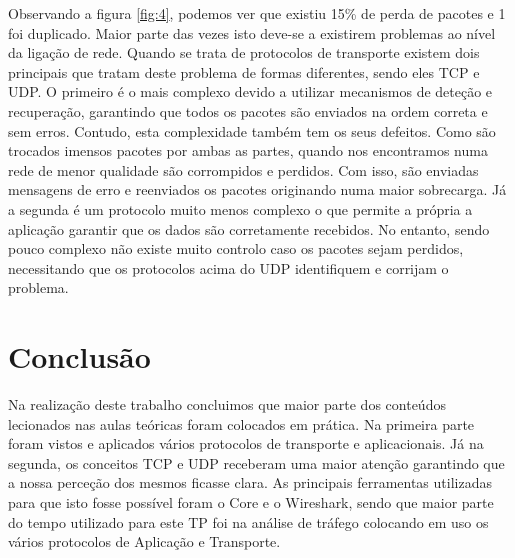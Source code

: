 \documentclass[a4paper]{report}
\begin{document}
Observando a figura \ref{fig:4}, podemos ver que existiu 15\% de perda de pacotes e 1 foi duplicado. Maior parte das vezes isto
deve-se a existirem problemas ao nível da ligação de rede. Quando se trata de protocolos de transporte existem dois principais
que tratam deste problema de formas diferentes, sendo eles TCP e UDP. O primeiro é o mais complexo devido a utilizar mecanismos
de deteção e recuperação, garantindo que todos os pacotes são enviados na ordem correta e sem erros. Contudo, esta complexidade
também tem os seus defeitos. Como são trocados imensos pacotes por ambas as partes, quando nos encontramos numa rede de menor 
qualidade são corrompidos e perdidos. Com isso, são enviadas mensagens de erro e reenviados os pacotes originando numa maior
sobrecarga. Já a segunda é um protocolo muito menos complexo o que permite a própria a aplicação garantir que os dados são 
corretamente recebidos. No entanto, sendo pouco complexo não existe muito controlo caso os pacotes sejam perdidos, necessitando
que os protocolos acima do UDP identifiquem e corrijam o problema.

\chapter{Conclusão}

Na realização deste trabalho concluimos que maior parte dos conteúdos lecionados nas aulas teóricas foram colocados em prática.
Na primeira parte foram vistos e aplicados vários protocolos de transporte e aplicacionais.
Já na segunda, os conceitos TCP e UDP receberam uma maior atenção garantindo que a nossa perceção dos mesmos ficasse clara.
As principais ferramentas utilizadas para que isto fosse possível foram o Core e o Wireshark, sendo que maior parte do tempo
utilizado para este TP foi na análise de tráfego colocando em uso os vários protocolos de Aplicação e Transporte.
\end{document}
